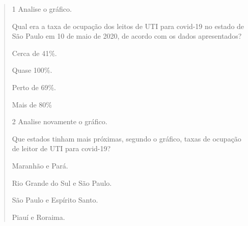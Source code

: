 \begin{quote}

\num{1} Analise o gráfico.


Qual era a taxa de ocupação dos leitos de UTI para covid-19 no estado de São
Paulo em 10 de maio de 2020, de acordo com os dados apresentados?

\begin{escolha}
\item Cerca de 41\%.

\item Quase 100\%.

\item Perto de 69\%.

\item Mais de 80\%
\end{escolha}


\num{2} Analise novamente o gráfico.


Que estados tinham mais próximas, segundo o gráfico, taxas de ocupação de leitor de UTI para covid-19?

\begin{escolha}
\item Maranhão e Pará.

\item Rio Grande do Sul e São Paulo.

\item São Paulo e Espírito Santo.

\item Piauí e Roraima.
\end{escolha}


\end{quote}
